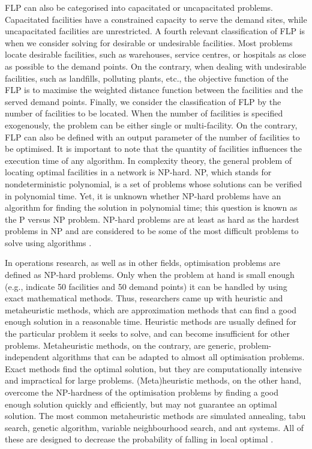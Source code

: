 FLP can also be categorised into capacitated or uncapacitated problems. Capacitated facilities have a constrained capacity to serve the demand sites, while uncapacitated facilities are unrestricted. A fourth relevant classification of FLP is when we consider solving for desirable or undesirable facilities. Most problems locate desirable facilities, such as warehouses, service centres, or hospitals as close as possible to the demand points. On the contrary, when dealing with undesirable facilities, such as landfills, polluting plants, etc., the objective function of the FLP is to maximise the weighted distance function between the facilities and the served demand points. Finally, we consider the classification of FLP by the number of facilities to be located. When the number of facilities is specified exogenously, the problem can be either single or multi-facility. On the contrary, FLP can also be defined with an output parameter of the number of facilities to be optimised. It is important to note that the quantity of facilities influences the execution time of any algorithm. In complexity theory, the general problem of locating optimal facilities in a network is NP-hard. NP, which stands for nondeterministic polynomial, is a set of problems whose solutions can be verified in polynomial time. Yet, it is unknown whether NP-hard problems have an algorithm for finding the solution in polynomial time; this question is known as the P versus NP problem. NP-hard problems are at least as hard as the hardest problems in NP and are considered to be some of the most difficult problems to solve using algorithms \cite{kokash2005introduction, cooper1963location}.

In operations research, as well as in other fields, optimisation problems are defined as NP-hard problems. Only when the problem at hand is small enough (e.g., \cite{sridharan1995capacitated} indicate 50 facilities and 50 demand points) it can be handled by using exact mathematical methods. Thus, researchers came up with heuristic and metaheuristic methods, which are approximation methods that can find a good enough solution in a reasonable time. Heuristic methods are usually defined for the particular problem it seeks to solve, and can become insufficient for other problems. Metaheuristic methods, on the contrary, are generic, problem-independent algorithms that can be adapted to almost all optimisation problems. Exact methods find the optimal solution, but they are computationally intensive and impractical for large problems. (Meta)heuristic methods, on the other hand, overcome the NP-hardness of the optimisation problems by finding a good enough solution quickly and efficiently, but may not guarantee an optimal solution. The most common metaheuristic methods are simulated annealing, tabu search, genetic algorithm, variable neighbourhood search, and ant systems. All of these are designed to decrease the probability  of falling in local optimal \citep{abdel2018metaheuristic}.

